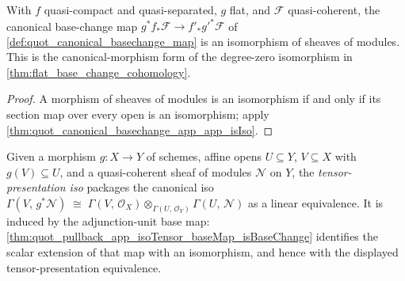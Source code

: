 \begin{theorem}\leanok
  \label{thm:quot_canonical_basechange_isIso}
  With \(f\) quasi-compact and quasi-separated, \(g\) flat, and
  \(\mathcal{F}\) quasi-coherent, the canonical base-change map
  \(g^* f_* \mathcal{F} \to f'_* g'^* \mathcal{F}\) of
  \cref{def:quot_canonical_basechange_map} is an isomorphism of sheaves of
  modules. This is the canonical-morphism form of the degree-zero isomorphism
  in \cref{thm:flat_base_change_cohomology}.
\end{theorem}
\begin{proof}\leanok
  A morphism of sheaves of modules is an isomorphism if and only if its
  section map over every open is an isomorphism; apply
  \cref{thm:quot_canonical_basechange_app_app_isIso}.
\end{proof}

\begin{definition}\leanok
  \label{def:quot_pullback_app_isoTensor}
  Given a morphism \(g : X \to Y\) of schemes, affine opens
  \(U \subseteq Y\), \(V \subseteq X\) with \(g(V) \subseteq U\), and a
  quasi-coherent sheaf of modules \(\mathcal{N}\) on \(Y\), the
  \emph{tensor-presentation iso} packages the canonical iso
  \(\Gamma(V,\, g^* \mathcal{N}) \;\cong\;
   \Gamma(V,\, \mathcal{O}_X) \otimes_{\Gamma(U,\, \mathcal{O}_Y)}
     \Gamma(U,\, \mathcal{N})\)
  as a linear equivalence. It is induced by the adjunction-unit base map:
  \cref{thm:quot_pullback_app_isoTensor_baseMap_isBaseChange} identifies
  the scalar extension of that map with an isomorphism, and hence with the
  displayed tensor-presentation equivalence.
\end{definition}

